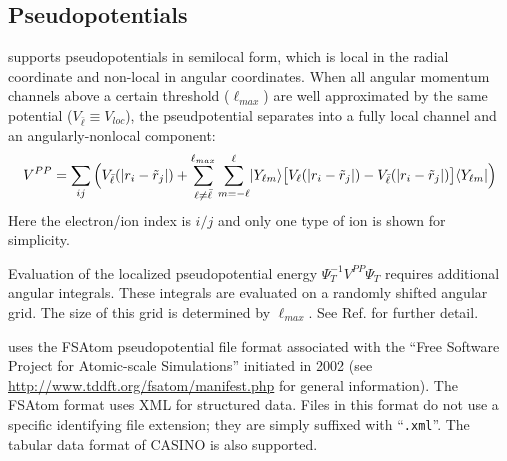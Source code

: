 \subsection{Pseudopotentials}
\label{sec:nlpp}
\qmcpack supports pseudopotentials in semilocal form, which is local in the radial coordinate and non-local in angular coordinates.  When all angular momentum channels above a certain threshold ($\ell_{max}$) are well approximated by the same potential ($V_{\bar{\ell}}\equiv V_{loc}$), the pseudpotential separates into a fully local channel and an angularly-nonlocal component:
\begin{align}
  V^{PP} = \sum_{ij}\Big(V_{\bar{\ell}}(\lvert r_i-\tilde{r}_j \rvert) + \sum_{\ell\ne\bar{\ell}}^{\ell_{max}}\sum_{m=-\ell}^\ell \lvert Y_{\ell m} \rangle \big[V_\ell(\lvert r_i-\tilde{r}_j \rvert) - V_{\bar{\ell}}(\lvert r_i-\tilde{r}_j \rvert) \big] \langle Y_{\ell m} \rvert \Big)
\end{align}  
Here the electron/ion index is $i/j$ and only one type of ion is shown for simplicity.

Evaluation of the localized pseudopotential energy $\Psi_T^{-1}V^{PP}\Psi_T$ requires additional angular integrals.  These integrals are evaluated on a randomly shifted angular grid.  The size of this grid is determined by $\ell_{max}$.  See Ref. \cite{Mitas1991} for further detail. 

\qmcpack uses the FSAtom pseudopotential file format associated with the ``Free Software Project for Atomic-scale Simulations'' initiated in 2002  (see \url{http://www.tddft.org/fsatom/manifest.php} for general information).  The FSAtom format uses XML for structured data.  Files in this format do not use a specific identifying file extension; they are simply suffixed with ``\texttt{.xml}''.  The tabular data format of CASINO is also supported.





